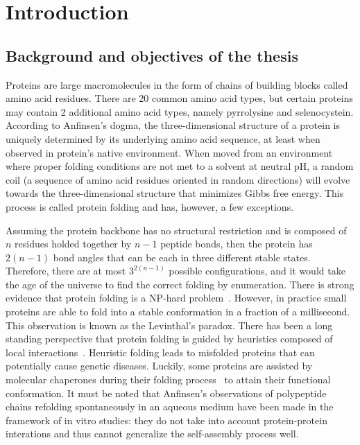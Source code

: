\chapter{Introduction}

\section{Background and objectives of the thesis}

    \setcounter{page}{1}
    \vspace*{0.5cm}

    Proteins are large macromolecules in the form of chains of building blocks called amino acid residues.
    There are 20 common amino acid types, but certain proteins may contain 2 additional amino acid types, namely pyrrolysine and selenocystein.
    According to Anfinsen's dogma, the three-dimensional structure of a protein is uniquely determined by its underlying amino acid sequence,
    at least when observed in protein's native environment. When moved from an environment where proper folding conditions are not met
    to a solvent at neutral pH, a random coil (a sequence of amino acid residues
    oriented in random directions) will evolve towards the three-dimensional structure that minimizes Gibbs free energy.
    This process is called protein folding and has, however, a few exceptions.

    Assuming the protein backbone has no structural restriction and is composed of $n$ residues holded together by $n-1$ peptide bonds,
    then the protein has $2(n-1)$ bond angles that can be each in three different stable states. Therefore, there are at most
    $3^{2(n-1)}$ possible configurations, and it would take the age of the universe to find the correct folding by enumeration.
    There is strong evidence that protein folding is a NP-hard problem~\cite{hart1997robust}.
    However, in practice small proteins are able to fold into a stable conformation in a fraction of a millisecond.
    This observation is known as the Levinthal's paradox. There has been a long standing perspective that protein folding
    is guided by heuristics composed of local interactions~\cite{levinthal1969fold}. Heuristic folding leads to misfolded proteins
    that can potentially cause genetic diseases. Luckily, some proteins are assisted by molecular chaperones during their folding process~\cite{ellis1991molecular}
    to attain their functional conformation. It must be noted that Anfinsen's observations of polypeptide chains refolding spontaneously in an aqueous medium
    have been made in the framework of in vitro studies: they do not take into account protein-protein interations and thus cannot generalize the
    self-assembly process well.


